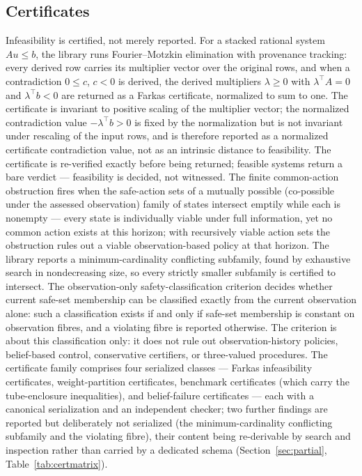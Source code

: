 \documentclass[11pt]{article}
\begin{document}
\subsection{Certificates}\label{sec:certificates}

Infeasibility is certified, not merely reported. For a stacked rational
system $A u \leq b$, the library runs Fourier--Motzkin elimination with
provenance tracking: every derived row carries its multiplier vector over
the original rows, and when a contradiction $0 \leq c$, $c < 0$ is derived,
the derived multipliers $\lambda \geq 0$ with $\lambda^{\top} A = 0$ and
$\lambda^{\top} b < 0$ are returned as a Farkas certificate, normalized to
sum to one. The certificate is invariant to positive scaling of the
multiplier vector; the normalized contradiction value
$-\lambda^{\top} b > 0$ is fixed by the normalization but is not
invariant under rescaling of the input rows, and is therefore reported
as a normalized certificate contradiction value, not as an intrinsic
distance to feasibility. The certificate is
re-verified exactly before being returned; feasible systems return a
bare verdict --- feasibility is decided, not witnessed. The finite
common-action obstruction fires when the safe-action sets of a mutually
possible (co-possible under the assessed observation) family of states
intersect emptily while each is nonempty --- every state is individually
viable under full information, yet no common action exists at this
horizon; with recursively viable action sets the obstruction rules out a
viable observation-based policy at that horizon. The library reports a
minimum-cardinality conflicting subfamily, found by exhaustive search in
nondecreasing size, so every strictly smaller subfamily is certified to
intersect. The observation-only safety-classification criterion decides
whether current safe-set membership can be classified exactly from the
current observation alone: such a classification exists if and only if
safe-set membership is constant on observation fibres, and a violating
fibre is reported otherwise. The criterion is about this classification
only: it does not rule out observation-history policies, belief-based
control, conservative certifiers, or three-valued procedures. The
certificate family comprises four serialized classes --- Farkas
infeasibility certificates, weight-partition certificates, benchmark
certificates (which carry the tube-enclosure inequalities), and
belief-failure certificates --- each with a canonical serialization and
an independent checker; two further findings are reported but
deliberately not serialized (the minimum-cardinality conflicting
subfamily and the violating fibre), their content being re-derivable by
search and inspection rather than carried by a dedicated schema
(Section~\ref{sec:partial}, Table~\ref{tab:certmatrix}).
\end{document}
